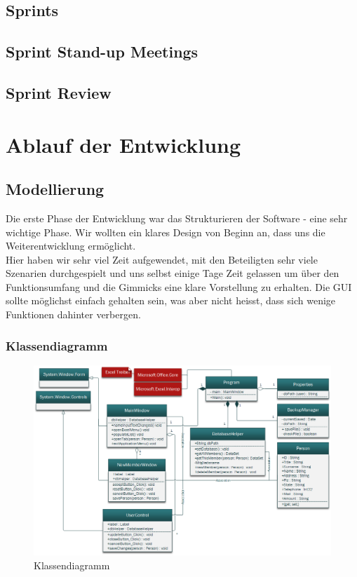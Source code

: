 \documentclass{article}
\begin{document}
\subsection{Sprints}
\subsection{Sprint Stand-up Meetings}
\subsection{Sprint Review}

\newpage

\section{Ablauf der Entwicklung}

\subsection{Modellierung}
Die erste Phase der Entwicklung war das Strukturieren der Software - eine sehr wichtige Phase. Wir wollten ein klares Design von Beginn an, dass uns die Weiterentwicklung ermöglicht.\\
Hier haben wir sehr viel Zeit aufgewendet, mit den Beteiligten sehr viele Szenarien durchgespielt und uns selbst einige Tage Zeit gelassen um über den Funktionsumfang und die Gimmicks eine klare Vorstellung zu erhalten. Die GUI sollte möglichst einfach gehalten sein, was aber nicht heisst, dass sich wenige Funktionen dahinter verbergen. 

\subsubsection{Klassendiagramm}
	
\begin{figure}[h]
	\centering
	\includegraphics[width=1.05 \textwidth]{KlassendiagrammBild}
	\caption{Klassendiagramm}
\end{figure}
\end{document}
